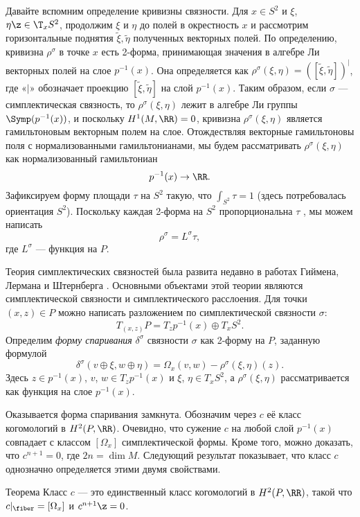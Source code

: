 Давайте вспомним определение кривизны связности.
Для $x \in S^2$ и $\xi$, $\eta \z\in \T_x S^2$, продолжим $\xi$ и $\eta$ до полей в окрестность $x$ и рассмотрим горизонтальные поднятия $\tilde\xi, \tilde\eta$ полученных векторных полей.
По определению, кривизна $\rho^\sigma$ в точке $x$ есть 2-форма, принимающая значения в алгебре Ли векторных полей на слое $p^{-1}(x)$.
Она определяется как $\rho^\sigma (\xi, \eta) = ([\tilde\xi, \tilde\eta])^\vert$, где «$\vert$» обозначает проекцию $[\tilde\xi, \tilde\eta]$ на слой $p^{-1} (x)$.
Таким образом, если $\sigma$ --- симплектическая связность, то $\rho^\sigma (\xi, \eta)$ лежит в алгебре Ли группы $\Symp(p^{-1}(x))$, и поскольку $H^1 (M, \RR) = 0$, кривизна $\rho^\sigma (\xi, \eta)$ является гамильтоновым векторным полем на слое.
Отождествляя векторные гамильтоновы поля с нормализованными гамильтонианами, мы будем рассматривать $\rho^\sigma (\xi, \eta)$ как нормализованный гамильтониан
\[p^{-1} (x) \to \RR.\]
Зафиксируем форму площади $\tau$ на $S^2$ такую, что $\int_{S^2} \tau = 1$ (здесь потребовалась ориентация $S^2$).
Поскольку каждая 2-форма на $S^2$ пропорциональна $\tau$ , мы можем написать 
\[\rho^\sigma = L^\sigma \tau,\]
где $L^\sigma$ --- функция на $P$.

Теория симплектических связностей была развита недавно в работах Гиймена, Лермана и Штернберга \cite{GLS,MS}.
Основными объектами этой теории являются  симплектической связности и  симплектического расслоения.
Для точки $(x, z) \in P$ можно написать разложением по симплектической связности $\sigma$:
\[T_{(x,z)} P = T_z p^{-1} (x) \oplus T_x S^2.\]
Определим \emph{форму спаривания} $\delta^\sigma$ связности $\sigma$ как 2-форму на $P$, заданную формулой 
\[\delta^\sigma (v \oplus \xi, w \oplus \eta) = \Omega_x (v, w) - \rho^\sigma (\xi, \eta)(z).\]
Здесь $z \in p^{-1} (x)$, $v$, $w \in T_z p^{-1} (x)$ и $\xi$, $\eta \in T_x S^2$, а $\rho^\sigma (\xi, \eta)$ рассматривается как функция на слое $p^{-1} (x)$.

Оказывается форма спаривания замкнута.
Обозначим через $c$ её класс когомологий в $H^2 (P, \RR)$.
Очевидно, что сужение $c$ на любой слой $p^{-1}(x)$ совпадает с классом $[\Omega_x]$ симплектической формы.
Кроме того, можно доказать, что $c^{n+1} = 0$, где $2n = \dim M$.
Следующий результат показывает, что класс $c$ однозначно определяется этими двумя свойствами.

\begin{thm}{Теорема}\label{9.3.A}
Класс $c$ --- это единственный класс когомологий в $H^2 (P, \RR)$, такой что $c|_\fiber = [\Omega_x]$ и $c^{n+1} \z= 0$.
\end{thm}

